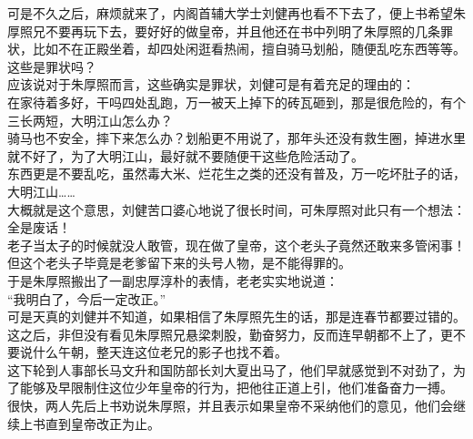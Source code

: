 \begin{multicols}{\theparacolNo}
可是不久之后，麻烦就来了，内阁首辅大学士刘健再也看不下去了，便上书希望朱厚照兄不要再玩下去，要好好的做皇帝，并且他还在书中列明了朱厚照的几条罪状，比如不在正殿坐着，却四处闲逛看热闹，擅自骑马划船，随便乱吃东西等等。\\

这些是罪状吗？\\

应该说对于朱厚照而言，这些确实是罪状，刘健可是有着充足的理由的：\\

在家待着多好，干吗四处乱跑，万一被天上掉下的砖瓦砸到，那是很危险的，有个三长两短，大明江山怎么办？\\

骑马也不安全，摔下来怎么办？划船更不用说了，那年头还没有救生圈，掉进水里就不好了，为了大明江山，最好就不要随便干这些危险活动了。\\

东西更是不要乱吃，虽然毒大米、烂花生之类的还没有普及，万一吃坏肚子的话，大明江山……\\

大概就是这个意思，刘健苦口婆心地说了很长时间，可朱厚照对此只有一个想法：\\

全是废话！\\

老子当太子的时候就没人敢管，现在做了皇帝，这个老头子竟然还敢来多管闲事！\\

但这个老头子毕竟是老爹留下来的头号人物，是不能得罪的。\\

于是朱厚照搬出了一副忠厚淳朴的表情，老老实实地说道：\\

“我明白了，今后一定改正。”\\

可是天真的刘健并不知道，如果相信了朱厚照先生的话，那是连春节都要过错的。\\

这之后，非但没有看见朱厚照兄悬梁刺股，勤奋努力，反而连早朝都不上了，更不要说什么午朝，整天连这位老兄的影子也找不着。\\

这下轮到人事部长马文升和国防部长刘大夏出马了，他们早就感觉到不对劲了，为了能够及早限制住这位少年皇帝的行为，把他往正道上引，他们准备奋力一搏。\\

很快，两人先后上书劝说朱厚照，并且表示如果皇帝不采纳他们的意见，他们会继续上书直到皇帝改正为止。\\


\end{multicols}
